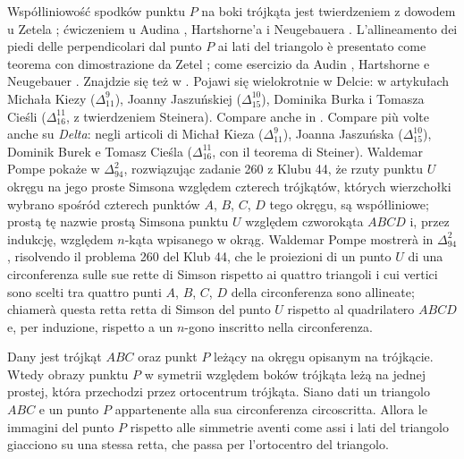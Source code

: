 Współliniowość spodków punktu $P$ na boki trójkąta jest twierdzeniem z dowodem u Zetela \cite[s. 55]{zetel_2020}; ćwiczeniem u Audina \cite[s. 104]{audin_2003}, Hartshorne'a \cite[s. 61]{hartshorne_2000} i Neugebauera \cite[s. 25]{neugebauer_2018}. %
L'allineamento dei piedi delle perpendicolari dal punto $P$ ai lati del triangolo è presentato come teorema con dimostrazione da Zetel \cite[p. 55]{zetel_2020}; come esercizio da Audin \cite[p. 104]{audin_2003}, Hartshorne \cite[p. 61]{hartshorne_2000} e Neugebauer \cite[p. 25]{neugebauer_2018}. %
Znajdzie się też w \cite[s. 24]{komisarczyk_2024}. %
Pojawi się wielokrotnie w Delcie: w artykułach Michała Kiezy ($\Delta_{11}^9$), Joanny Jaszuńskiej ($\Delta_{15}^{10}$), Dominika Burka i Tomasza Cieśli ($\Delta_{16}^{11}$, z twierdzeniem Steinera). %
Compare anche in \cite[p. 24]{komisarczyk_2024}. %
Compare più volte anche su \emph{Delta}: negli articoli di Michał Kieza ($\Delta_{11}^9$), Joanna Jaszuńska ($\Delta_{15}^{10}$), Dominik Burek e Tomasz Cieśla ($\Delta_{16}^{11}$, con il teorema di Steiner). %
Waldemar Pompe pokaże w $\Delta_{94}^{2}$, rozwiązując zadanie 260 z Klubu 44, że rzuty punktu $U$ okręgu na jego proste Simsona względem czterech trójkątów, których wierzchołki wybrano spośród czterech punktów $A$, $B$, $C$, $D$ tego okręgu, są współliniowe; prostą tę nazwie prostą Simsona punktu $U$ względem czworokąta $ABCD$ i, przez indukcję, względem $n$-kąta wpisanego w okrąg. %
Waldemar Pompe mostrerà in $\Delta_{94}^{2}$, risolvendo il problema 260 del Klub 44, che le proiezioni di un punto $U$ di una circonferenza sulle sue rette di Simson rispetto ai quattro triangoli i cui vertici sono scelti tra quattro punti $A$, $B$, $C$, $D$ della circonferenza sono allineate; chiamerà questa retta retta di Simson del punto $U$ rispetto al quadrilatero $ABCD$ e, per induzione, rispetto a un $n$-gono inscritto nella circonferenza. %

\begin{proposition}
[twierdzenie Steinera] %
[teorema di Steiner] %
	Dany jest trójkąt $ABC$ oraz punkt $P$ leżący na okręgu opisanym na trójkącie. %
	Wtedy obrazy punktu $P$ w symetrii względem boków trójkąta leżą na jednej prostej, która przechodzi przez ortocentrum trójkąta. %
	Siano dati un triangolo $ABC$ e un punto $P$ appartenente alla sua circonferenza circoscritta. %
	Allora le immagini del punto $P$ rispetto alle simmetrie aventi come assi i lati del triangolo giacciono su una stessa retta, che passa per l'ortocentro del triangolo. %
\end{proposition}

